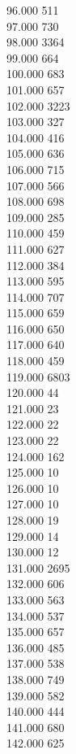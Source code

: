 { 96.000	511 \\
 97.000	730 \\
 98.000	3364 \\
 99.000	664 \\
 100.000	683 \\
 101.000	657 \\
 102.000	3223 \\
 103.000	327 \\
 104.000	416 \\
 105.000	636 \\
 106.000	715 \\
 107.000	566 \\
 108.000	698 \\
 109.000	285 \\
 110.000	459 \\
 111.000	627 \\
 112.000	384 \\
 113.000	595 \\
 114.000	707 \\
 115.000	659 \\
 116.000	650 \\
 117.000	640 \\
 118.000	459 \\
 119.000	6803 \\
 120.000	44 \\
 121.000	23 \\
 122.000	22 \\
 123.000	22 \\
 124.000	162 \\
 125.000	10 \\
 126.000	10 \\
 127.000	10 \\
 128.000	19 \\
 129.000	14 \\
 130.000	12 \\
 131.000	2695 \\
 132.000	606 \\
 133.000	563 \\
 134.000	537 \\
 135.000	657 \\
 136.000	485 \\
 137.000	538 \\
 138.000	749 \\
 139.000	582 \\
 140.000	444 \\
 141.000	680 \\
 142.000	625 \\
}
